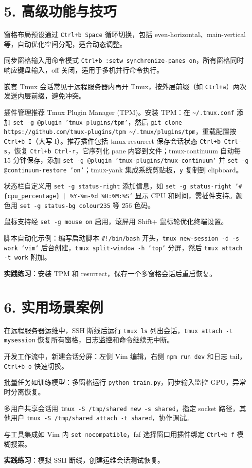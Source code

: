 \chapter{5. 高级功能与技巧}
窗格布局预设通过 \texttt{Ctrl+b Space} 循环切换，包括 even-horizontal、main-vertical 等，自动优化空间分配，适合动态调整。\par
同步窗格输入用命令模式 \texttt{Ctrl+b :setw synchronize-panes on}，所有窗格同时响应键盘输入，off 关闭，适用于多机并行命令执行。\par
嵌套 Tmux 会话常见于远程服务器内再开 Tmux，按外层前缀（如 \texttt{Ctrl+a}）两次发送内层前缀，避免冲突。\par
插件管理推荐 Tmux Plugin Manager (TPM)。安装 TPM：在 \texttt{\~{}/.tmux.conf} 添加 \texttt{set -g @plugin 'tmux-plugins/tpm'}，然后 \texttt{git clone https://github.com/tmux-plugins/tpm \~{}/.tmux/plugins/tpm}，重载配置按 \texttt{Ctrl+b I}（大写 I）。推荐插件包括 tmux-resurrect 保存会话状态 \texttt{Ctrl+b Ctrl-s}，恢复 \texttt{Ctrl+b Ctrl-r}，它序列化 pane 内容到文件；tmux-continuum 自动每 15 分钟保存，添加 \texttt{set -g @plugin 'tmux-plugins/tmux-continuum'} 并 \texttt{set -g @continuum-restore 'on'}；tmux-yank 集成系统剪贴板，\texttt{y} 复制到 clipboard。\par
状态栏自定义用 \texttt{set -g status-right} 添加信息，如 \texttt{set -g status-right '\#{}\{{}cpu\_{}percentage\}{} | \%{}Y-\%{}m-\%{}d \%{}H:\%{}M:\%{}S'} 显示 CPU 和时间，需插件支持。颜色用 \texttt{set -g status-bg colour235} 等 256 色码。\par
鼠标支持经 \texttt{set -g mouse on} 启用，滚屏用 Shift+ 鼠标轮优化终端设置。\par
脚本自动化示例：编写启动脚本 \texttt{\#{}!/bin/bash} 开头，\texttt{tmux new-session -d -s work 'vim'} 后台创建，\texttt{tmux split-window -h 'top'} 分屏，然后 \texttt{tmux attach -t work} 附加。\par
\textbf{实践练习}：安装 TPM 和 resurrect，保存一个多窗格会话后重启恢复。\par
\chapter{6. 实用场景案例}
在远程服务器运维中，SSH 断线后运行 \texttt{tmux ls} 列出会话，\texttt{tmux attach -t mysession} 恢复所有窗格，日志监控和命令继续无中断。\par
开发工作流中，新建会话分屏：左侧 Vim 编辑，右侧 \texttt{npm run dev} 和日志 tail，\texttt{Ctrl+b o} 快速切换。\par
批量任务如训练模型：多窗格运行 \texttt{python train.py}，同步输入监控 GPU，异常时分离恢复。\par
多用户共享会话用 \texttt{tmux -S /tmp/shared new -s shared}，指定 socket 路径，其他用户 \texttt{tmux -S /tmp/shared attach -t shared}，协作调试。\par
与工具集成如 Vim 内 \texttt{set nocompatible}，fzf 选择窗口用插件绑定 \texttt{Ctrl+b f} 模糊搜索。\par
\textbf{实践练习}：模拟 SSH 断线，创建运维会话测试恢复。\par
